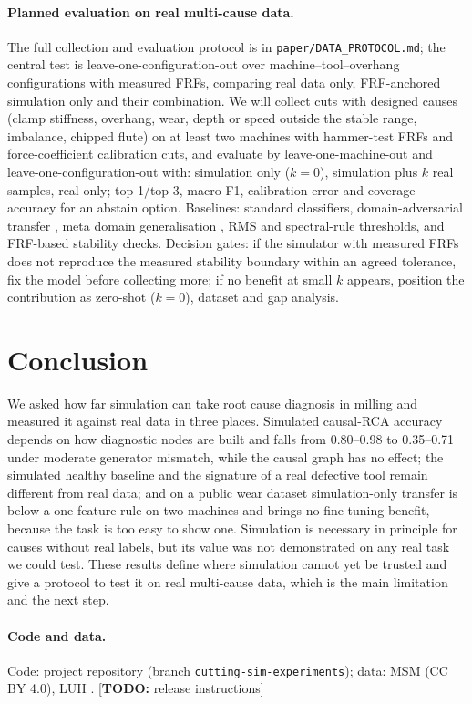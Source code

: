 \documentclass[11pt]{article}
\newcommand{\todo}[1]{{\color{red}[\textbf{TODO:} #1]}}
\begin{document}
\paragraph{Planned evaluation on real multi-cause data.} The full collection and evaluation protocol is in \texttt{paper/DATA\_PROTOCOL.md}; the central test is leave-one-configuration-out over machine--tool--overhang configurations with measured FRFs, comparing real data only, FRF-anchored simulation only and their combination. We will collect cuts with designed causes (clamp stiffness, overhang, wear, depth or speed outside the stable range, imbalance, chipped flute) on at least two machines with hammer-test FRFs and force-coefficient calibration cuts, and evaluate by leave-one-machine-out and leave-one-configuration-out with: simulation only ($k{=}0$), simulation plus $k$ real samples, real only; top-1/top-3, macro-F1, calibration error and coverage--accuracy for an abstain option. Baselines: standard classifiers, domain-adversarial transfer \citep{wang2020datwear}, meta domain generalisation \citep{li2023metadg}, RMS and spectral-rule thresholds, and FRF-based stability checks. Decision gates: if the simulator with measured FRFs does not reproduce the measured stability boundary within an agreed tolerance, fix the model before collecting more; if no benefit at small $k$ appears, position the contribution as zero-shot ($k{=}0$), dataset and gap analysis.

\section{Conclusion}
We asked how far simulation can take root cause diagnosis in milling and measured it against real data in three places.
Simulated causal-RCA accuracy depends on how diagnostic nodes are built and falls from 0.80--0.98 to 0.35--0.71 under moderate generator mismatch, while the causal graph has no effect; the simulated healthy baseline and the signature of a real defective tool remain different from real data; and on a public wear dataset simulation-only transfer is below a one-feature rule on two machines and brings no fine-tuning benefit, because the task is too easy to show one.
Simulation is necessary in principle for causes without real labels, but its value was not demonstrated on any real task we could test. These results define where simulation cannot yet be trusted and give a protocol to test it on real multi-cause data, which is the main limitation and the next step.

\paragraph{Code and data.} Code: project repository (branch \texttt{cutting-sim-experiments}); data: MSM \citep{kim2026msm} (CC BY 4.0), LUH \citep{denkena2023luh}. \todo{release instructions}
\end{document}
